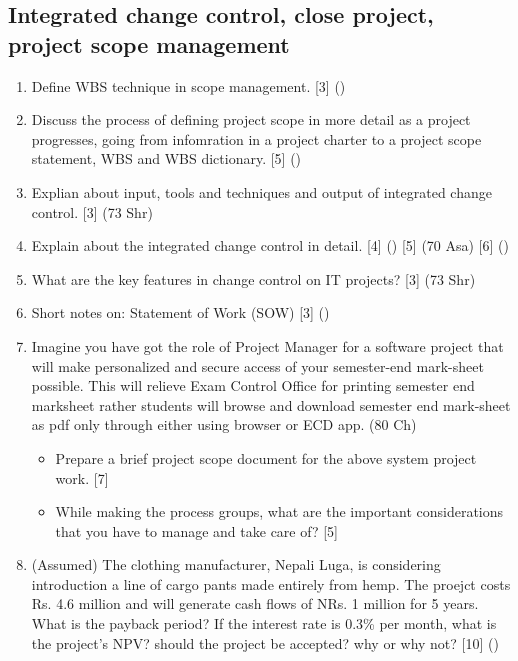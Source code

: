 \documentclass[12pt]{article}
\begin{document}
  \subsection{Integrated change control, close project, project scope management}
    \begin{enumerate}
      \item Define WBS technique in scope management. \hfill [3] ()

      \item Discuss the process of defining project scope in more detail as a project progresses, going from infomration in a project charter to a project scope statement, WBS and WBS dictionary. \hfill [5] ()
        
      \item Explian about input, tools and techniques and output of integrated change control. \hfill [3] (73 Shr)

      \item Explain about the integrated change control in detail. \hfill [4] () [5] (70 Asa) [6] ()

      \item What are the key features in change control on IT projects? \hfill [3] (73 Shr)

      \item Short notes on: Statement of Work (SOW) \hfill [3] ()

      \item Imagine you have got the role of Project Manager for a software project that will make personalized and secure access of your semester-end mark-sheet possible. This will relieve Exam Control Office for printing semester end marksheet rather students will browse and download semester end mark-sheet as pdf only through either using browser or ECD app. \hfill (80 Ch)
      \begin{itemize}[noitemsep]
        \item Prepare a brief project scope document for the above system project work. \hfill [7]
        \item While making the process groups, what are the important considerations that you have to manage and take care of? \hfill [5]
      \end{itemize}

      \item (Assumed) The clothing manufacturer, Nepali Luga, is considering introduction a line of cargo pants made entirely from hemp. The proejct costs Rs. 4.6 million and will generate cash flows of NRs. 1 million for 5 years. What is the payback period? If the interest rate is 0.3\% per month, what is the project's NPV? should the project be accepted? why or why not? \hfill [10] ()


\end{enumerate}
\end{document}
